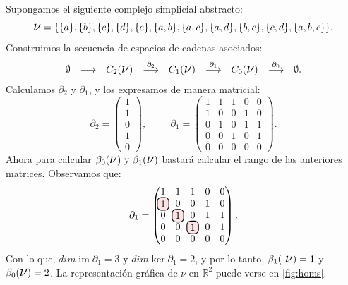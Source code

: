 \documentclass[12pt, a4paper, twoside]{book}
\newcommand\hlightr[1]{\tikz[overlay, remember picture,baseline=-
\the\dimexpr\fontdimen22\textfont2\relax]\node[rectangle,fill=red!50,rounded 
corners,fill opacity = 0.2,draw,thick,text opacity =1] {$#1$};}
\numberwithin{equation}{section}
\theoremstyle{definition}
\newenvironment{ejem}
  {\pushQED{\qed}\renewcommand{\qedsymbol}{$\blacktriangleleft$}\ejemplo}
  {\popQED\endejemplo}
\theoremstyle{remark}
\theoremstyle{plain}
\DeclareMathOperator{\Ima}{im}
\begin{document}
	\begin{ejem}
		Supongamos el siguiente complejo simplicial abstracto:
		\begin{equation*} 
			\text{{\Large $\nu$}}=\{\{a\},\{b\},\{c\},\{d\},\{e\},
			\{a,b\},\{a,c\},\{a,d\},\{b,c\},\{c,d\},\{a,b,c\}\}.
		\end{equation*}
		Construimos la secuencia de espacios de cadenas asociados:
		\begin{equation*}
			 \left.
			\begin{array}{ccccccccc}
				\emptyset & 
				\longrightarrow & C_{2}(
				\text{{\Large $\nu$}}) & 
				\overset{\partial_{2}}{
				\longrightarrow} & C_{1}(\text{{\Large $\nu$}}) 
						& \overset{\partial_{1}}{
				\longrightarrow} 
				& C_{0}(\text{{\Large $\nu$}}) & 
				\overset{\partial_{0}}{
				\longrightarrow} & \emptyset. 
			\end{array}
			\right. 
		\end{equation*}
		Calculamos $\partial_{2}$ y $\partial_{1}$, y los expresamos 
		de manera matricial:
		\begin{equation*}
			\partial_{2}=
			\begin{pmatrix}
			1 \\
			1 \\
			0 \\
			1 \\
			0
			\end{pmatrix},
			\hspace{1cm}
			\partial_{1}=
			\begin{pmatrix}
			1 & 1 & 1 & 0 & 0\\
			1 & 0 & 0 & 1 & 0\\
			0 & 1 & 0 & 1 & 1\\
			0 & 0 & 1 & 0 & 1\\
			0 & 0 & 0 & 0 & 0
			\end{pmatrix}.
		\end{equation*}
		Ahora para calcular $\beta_{0}(\text{{\Large $\nu$}}) 
		\text{ y } \beta_{1}(\text{{\Large $\nu$}})$ bastará
		calcular el rango de las anteriores matrices. Observamos que:
		\begin{equation*}
			\partial_{1}=
			\begin{pmatrix}
			1 & 1 & 1 & 0 & 0\\
			\hlightr{1} & 0 & 0 & 1 & 0\\
			0 & \hlightr{1} & 0 & 1 & 1\\
			0 & 0 & \hlightr{1} & 0 & 1\\
			0 & 0 & 0 & 0 & 0
			\end{pmatrix}.
		\end{equation*}
		Con lo que, $dim \Ima \partial_{1}=3 \text{ y } 
		dim \ker \partial_{1}=2$, y por lo tanto, $\beta_{1}(\text{
		{\Large $\nu$}})=1$ y $\beta_{0}(\text{{\Large $\nu$}})=2$. La
		representación gráfica de {\Large $\nu$} en $\mathbb{R}^{2}$
		puede verse en \autoref{fig:homs}.
		

\end{ejem}
\end{document}
